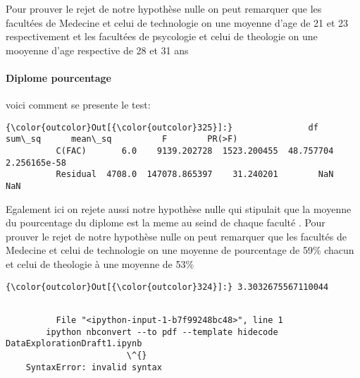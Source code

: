 \documentclass[11pt]{article}
\begin{document}
    Pour prouver le rejet de notre hypothèse nulle on peut remarquer que les
facultées de Medecine et celui de technologie on une moyenne d'age de 21
et 23 respectivement et les facultées de psycologie et celui de
theologie on une mooyenne d'age respective de 28 et 31 ans

    \paragraph{Diplome pourcentage}\label{diplome-pourcentage}

    voici comment se presente le test:

            \begin{Verbatim}[commandchars=\\\{\}]
{\color{outcolor}Out[{\color{outcolor}325}]:}               df         sum\_sq      mean\_sq          F        PR(>F)
          C(FAC)       6.0    9139.202728  1523.200455  48.757704  2.256165e-58
          Residual  4708.0  147078.865397    31.240201        NaN           NaN
\end{Verbatim}
        
    Egalement ici on rejete aussi notre hypothèse nulle qui stipulait que la
moyenne du pourcentage du diplome est la meme au seind de chaque faculté
. Pour prouver le rejet de notre hypothèse nulle on peut remarquer que
les facultés de Medecine et celui de technologie on une moyenne de
pourcentage de 59\% chacun et celui de theologie à une moyenne de 53\%

            \begin{Verbatim}[commandchars=\\\{\}]
{\color{outcolor}Out[{\color{outcolor}324}]:} 3.3032675567110044
\end{Verbatim}
        
    \begin{Verbatim}[commandchars=\\\{\}]

          File "<ipython-input-1-b7f99248bc48>", line 1
        ipython nbconvert --to pdf --template hidecode DataExplorationDraft1.ipynb
                        \^{}
    SyntaxError: invalid syntax


    \end{Verbatim}


    
    
    
    
\end{document}
